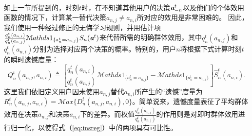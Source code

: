 如上一节所提到的，时刻$t$时，在不知道其他用户的决策$\emph{\textbf{a}}^t_{-n}$以及他们的个体效用函数的情况下，计算某一替代决策$a_{n,j}\neq a_{n,i}$所对应的效用是非常困难的。
因此，我们使用一种经过修正的无悔学习规则\cite{Hart_areinforcement}，并用估计项$\frac{q^t_n(a_{n,i})}{q^t_n(a_{n,j})}\mathcal{M}athds{1}_{\{a^t_n=a_{n,j}\}}S_n(\emph{\textbf{a}}^t)$来代替所需的明确群体效用，其中$q^t_n(a_{n,j})$和$q^t_n(a_{n,i})$分别为选择对应两个决策的概率。特别的，用户$n$将根据下式计算时刻$t$的瞬时遗憾度量：
\begin{equation}\label{eq:insreg}
Q^t_n(a_{n,j},a_{n,i})\triangleq\left[\frac{q^t_n(a_{n,i})}{q^t_n(a_{n,j})}\mathcal{M}athds{1}_{\{a^t_n=a_{n,j}\}}-\mathcal{M}athds{1}_{\{a^t_n=a_{n,i}\}}\right]\hat{S}^t_n(a_{n,i}).
\end{equation}
这里我们依旧定义用户因未使用$a_{n,j}$替代$a_{n,i}$所产生的“遗憾”度量为$R_n^t(a_{n,j},a_{n,i})=\mathcal{M}ax\{D_n^t(a_{n,j},a_{n,i}),0\}$。简单说来，遗憾度量表征了平均群体效用在决策$a_{n,j}$和决策$a_{n,i}$下的差异。而权值$\frac{q^t_n(a_{n,i})}{q^t_n(a_{n,j})}$的作用则是对即时群体效用进行归一化，以使得式（\ref{eq:insreg}）中的两项具有可比性。

